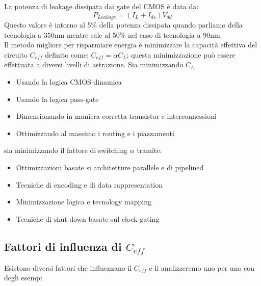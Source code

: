La potenza di leakage dissipata dai gate del CMOS è data da:
$$P_{Leakage} = (I_L+ I_{ds}) V_{dd}$$
Questo valore è intorno al 5\% della potenza dissipata quando parliamo della tecnologia a 350nm mentre sale al 50\% nel caso di tecnologia a 90nm.\\
Il metodo migliore per risparmiare energia è minimizzare la capacità effettiva del circuito $C_{eff}$ definito come: $C_{eff} = \alpha C_L$; questa minimizzazione può essere effettuata a diversi livelli di astrazione. Sia minimizzando $C_L$
\begin{itemize}
\item Usando la logica CMOS dinamica
\item Usando la logica pass-gate
\item Dimensionando in maniera corretta transistor e interconnessioni
\item Ottimizzando al massimo i routing e i piazzamenti
\end{itemize}
sia minimizzando il fattore di switching $\alpha$ tramite:
\begin{itemize}
\item Ottimizzazioni basate si architetture parallele e di pipelined
\item Tecniche di encoding e di data rappresentation
\item Minimizzazione logica e tecnology mapping
\item Tecniche di shut-down basate sul clock gating
\end{itemize}
\subsection{Fattori di influenza di $C_{eff}$}
Esistono diversi fattori che influenzano il $C_{eff}$ e li analizzeremo uno per uno con degli esempi
